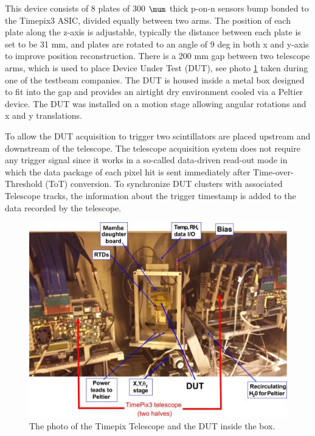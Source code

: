 This device consists of 8 plates of 300 $\mum$ thick p-on-n sensors bump bonded to the Timepix3 ASIC, divided equally between two arms. The position of each plate along the z-axis is adjustable, typically the distance between each plate is set to be 31 mm, and plates are rotated to an angle of 9 deg in both x and y-axis to improve position reconstruction. There is a 200 mm gap between two telescope arms, which is used to place Device Under Test (DUT), see photo \ref{fig:telescope_photo} taken during one of the testbeam companies. The DUT is housed inside a metal box designed to fit into the gap and provides an airtight dry environment cooled via a Peltier device. 
The DUT was installed on a motion stage allowing angular rotations and x and y translations. 

To allow the DUT acquisition to trigger two scintillators are placed upstream and downstream of the telescope. The telescope acquisition system does not require any trigger signal since it works in a so-called data-driven read-out mode in which the data package of each pixel hit is sent immediately after Time-over-Threshold (ToT) conversion. To synchronize DUT clusters with associated Telescope tracks, the information about the trigger timestamp is added to the data recorded by the telescope.  


\begin{figure}[!h]
\centering
\hspace*{-1cm}\includegraphics{figures/telescope_photo.jpg}
\caption{The photo of the Timepix Telescope and the DUT inside the box. }
\label{fig:telescope_photo}
\end{figure}

